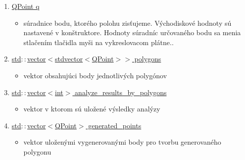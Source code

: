 \documentclass[12pt]{article}
\begin{document}
\begin{enumerate}
\item[] \underline{QPoint q}
\begin{itemize}
\item súradnice bodu, ktorého polohu zisťujeme. Východiskové hodnoty sú nastavené v konštruktore. Hodnoty súradníc určovaného bodu sa menia stlačením tlačidla myši na vykreslovacom plátne..
\end{itemize}
\item[] \underline{std$::$vector$<$stdvector$<$QPoint$>>$ polygons}
\begin{itemize}
\item vektor obsahujúci body jednotlivých polygónov
\end{itemize}
\item[] \underline{std$::$vector$<$int$>$ analyze\_results\_by\_polygons}
\begin{itemize}
\item vektor v ktorom sú uložené výsledky analýzy
\end{itemize}
\item[] \underline{std$::$vector$<$QPoint$>$ generated\_points}
\begin{itemize}
\item vektor uloženými vygenerovanými body pro tvorbu generovaného polygonu
\end{itemize}
\end{enumerate}
\end{document}
